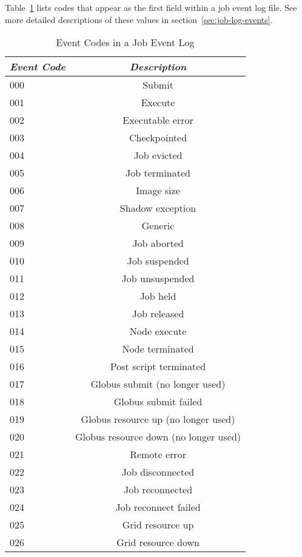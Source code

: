 Table~\ref{table:user-log-event-codes} lists codes that appear as 
the first field within a job event log file.
See more detailed descriptions of these values in
section~\ref{sec:job-log-events}.
\begin{center}
\begin{table}[H]
\caption{\label{table:user-log-event-codes}Event Codes in a Job Event Log}
\begin{tabular}{|l|c|} \hline
\emph{Event Code} & \emph{Description}   \\ \hline \hline
000   &   Submit  \\ \hline
001   &   Execute  \\ \hline
002   &   Executable error  \\ \hline
003   &   Checkpointed  \\ \hline
004   &   Job evicted  \\ \hline
005   &   Job terminated  \\ \hline
006   &   Image size  \\ \hline
007   &   Shadow exception  \\ \hline
008   &   Generic  \\ \hline
009   &   Job aborted  \\ \hline
010  &   Job suspended  \\ \hline
011  &   Job unsuspended  \\ \hline
012  &   Job held  \\ \hline
013  &   Job released  \\ \hline
014  &   Node execute  \\ \hline
015  &   Node terminated  \\ \hline
016  &   Post script terminated  \\ \hline
017  &   Globus submit (no longer used)  \\ \hline
018  &   Globus submit failed  \\ \hline
019  &   Globus resource up (no longer used)  \\ \hline
020  &   Globus resource down (no longer used)  \\ \hline
021  &   Remote error  \\ \hline
022  &   Job disconnected  \\ \hline
023  &   Job reconnected  \\ \hline
024  &   Job reconnect failed  \\ \hline
025  &   Grid resource up \\ \hline
026  &   Grid resource down \\ \hline

\end{tabular}
\end{table}
\end{center}
